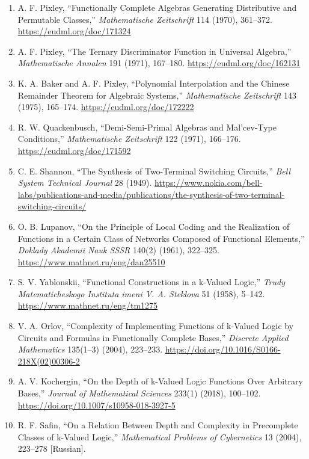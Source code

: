 \documentclass[
  11pt,
]{article}
\providecommand{\tightlist}{%
  \setlength{\itemsep}{0pt}\setlength{\parskip}{0pt}}
\theoremstyle{definition}
\theoremstyle{remark}
\begin{document}
\begin{enumerate}
\def\labelenumi{\arabic{enumi}.}
\tightlist
\item
  A. F. Pixley, ``Functionally Complete Algebras Generating Distributive
  and Permutable Classes,'' \emph{Mathematische Zeitschrift} 114 (1970),
  361--372. \url{https://eudml.org/doc/171324}
\item
  A. F. Pixley, ``The Ternary Discriminator Function in Universal
  Algebra,'' \emph{Mathematische Annalen} 191 (1971), 167--180.
  \url{https://eudml.org/doc/162131}
\item
  K. A. Baker and A. F. Pixley, ``Polynomial Interpolation and the
  Chinese Remainder Theorem for Algebraic Systems,'' \emph{Mathematische
  Zeitschrift} 143 (1975), 165--174. \url{https://eudml.org/doc/172222}
\item
  R. W. Quackenbusch, ``Demi-Semi-Primal Algebras and Mal'cev-Type
  Conditions,'' \emph{Mathematische Zeitschrift} 122 (1971), 166--176.
  \url{https://eudml.org/doc/171592}
\item
  C. E. Shannon, ``The Synthesis of Two-Terminal Switching Circuits,''
  \emph{Bell System Technical Journal} 28 (1949).
  \url{https://www.nokia.com/bell-labs/publications-and-media/publications/the-synthesis-of-two-terminal-switching-circuits/}
\item
  O. B. Lupanov, ``On the Principle of Local Coding and the Realization
  of Functions in a Certain Class of Networks Composed of Functional
  Elements,'' \emph{Doklady Akademii Nauk SSSR} 140(2) (1961), 322--325.
  \url{https://www.mathnet.ru/eng/dan25510}
\item
  S. V. Yablonskii, ``Functional Constructions in a k-Valued Logic,''
  \emph{Trudy Matematicheskogo Instituta imeni V. A. Steklova} 51
  (1958), 5--142. \url{https://www.mathnet.ru/eng/tm1275}
\item
  V. A. Orlov, ``Complexity of Implementing Functions of k-Valued Logic
  by Circuits and Formulas in Functionally Complete Bases,''
  \emph{Discrete Applied Mathematics} 135(1--3) (2004), 223--233.
  \url{https://doi.org/10.1016/S0166-218X(02)00306-2}
\item
  A. V. Kochergin, ``On the Depth of k-Valued Logic Functions Over
  Arbitrary Bases,'' \emph{Journal of Mathematical Sciences} 233(1)
  (2018), 100--102. \url{https://doi.org/10.1007/s10958-018-3927-5}
\item
  R. F. Safin, ``On a Relation Between Depth and Complexity in
  Precomplete Classes of k-Valued Logic,'' \emph{Mathematical Problems
  of Cybernetics} 13 (2004), 223--278 {[}Russian{]}.

\end{enumerate}
\end{document}
